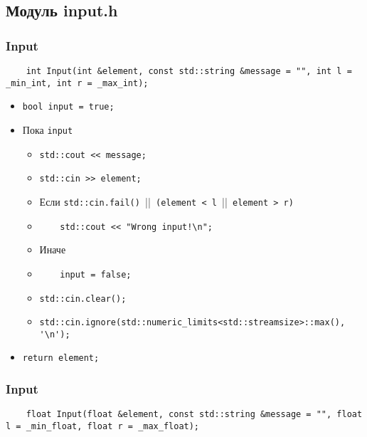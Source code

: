 \subsection*{Модуль input.h}


\subsubsection*{Input}

\begin{lstlisting}
	int Input(int &element, const std::string &message = "", int l = _min_int, int r = _max_int);
\end{lstlisting}

\begin{itemize}
	\item \verb|bool input = true;|
	\item Пока \verb|input|
		\begin{itemize}
			\item \verb|std::cout << message;|
			\item \verb|std::cin >> element;|
			\item Если \verb|std::cin.fail() |||\verb| (element < l |||\verb| element > r)|
			\item \verb|    std::cout << "Wrong input!\n";|
			\item Иначе
			\item \verb|    input = false;|
			\item \verb|std::cin.clear();|
			\item \verb|std::cin.ignore(std::numeric_limits<std::streamsize>::max(), '\n');|
		\end{itemize}
    \item \verb|return element;|
\end{itemize}


\subsubsection*{Input}

\begin{lstlisting}
	float Input(float &element, const std::string &message = "", float l = _min_float, float r = _max_float);
\end{lstlisting}

